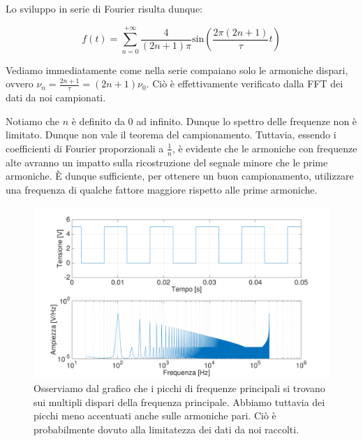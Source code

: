 Lo sviluppo in serie di Fourier risulta dunque: 

\begin{equation}
f(t)=\sum_{n=0}^{+\infty}\frac{4}{(2n+1)\pi}\mathrm{sin} \left(\frac{2\pi(2n+1)}{\tau}t\right)
\end{equation}

Vediamo immediatamente come nella serie compaiano solo le armoniche dispari, ovvero $\nu_n=\frac{2n+1}{\tau}=(2n+1)\nu_0$. Ciò è effettivamente verificato dalla FFT dei dati da noi campionati.

Notiamo che $n$ è definito da 0 ad infinito. Dunque lo spettro delle frequenze non è limitato. Dunque non vale il teorema del campionamento. Tuttavia, essendo i coefficienti di Fourier proporzionali a $\frac{1}{n}$, è evidente che le armoniche con frequenze alte avranno un impatto sulla ricostruzione del segnale minore che le prime armoniche. È dunque sufficiente, per ottenere un buon campionamento, utilizzare una frequenza di qualche fattore maggiore rispetto alle prime armoniche. 





\begin{figure}[H]
\centering
	\includegraphics[width=.63\textwidth]{../E13/latex/quadra100hz@10000,200000.pdf}
	\caption{Osserviamo dal grafico che i picchi di frequenze principali si trovano sui multipli dispari della frequenza principale. Abbiamo tuttavia dei picchi meno accentuati anche sulle armoniche pari. Ciò è probabilmente dovuto alla limitatezza dei dati da noi raccolti.}
	\label{quadra}
\end{figure}

